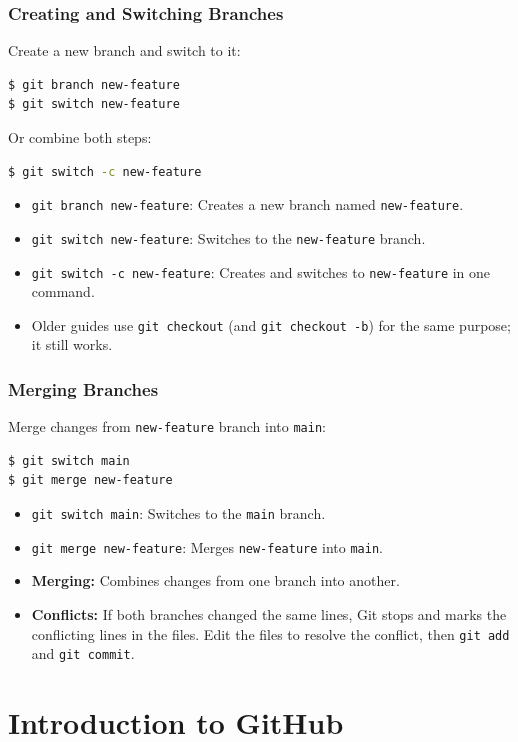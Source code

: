 \begin{frame}[fragile]
	\frametitle{Creating and Switching Branches}
	Create a new branch and switch to it:
\begin{lstlisting}[language=bash]
$ git branch new-feature
$ git switch new-feature
\end{lstlisting}
	Or combine both steps:
\begin{lstlisting}[language=bash]
$ git switch -c new-feature
\end{lstlisting}
	\begin{itemize}
		\item \texttt{git branch new-feature}: Creates a new branch named \texttt{new-feature}.
		\item \texttt{git switch new-feature}: Switches to the \texttt{new-feature} branch.
		\item \texttt{git switch -c new-feature}: Creates and switches to \texttt{new-feature} in one command.
		\item Older guides use \texttt{git checkout} (and \texttt{git checkout -b}) for the same purpose; it still works.
	\end{itemize}
\end{frame}

\begin{frame}[fragile]
	\frametitle{Merging Branches}
	Merge changes from \texttt{new-feature} branch into \texttt{main}:
\begin{lstlisting}[language=bash]
$ git switch main
$ git merge new-feature
\end{lstlisting}
	\begin{itemize}
		\item \texttt{git switch main}: Switches to the \texttt{main} branch.
		\item \texttt{git merge new-feature}: Merges \texttt{new-feature} into \texttt{main}.
		\item \textbf{Merging:} Combines changes from one branch into another.
		\item \textbf{Conflicts:} If both branches changed the same lines, Git stops and marks the conflicting lines in the files. Edit the files to resolve the conflict, then \texttt{git add} and \texttt{git commit}.
	\end{itemize}
\end{frame}

\section{Introduction to GitHub}

